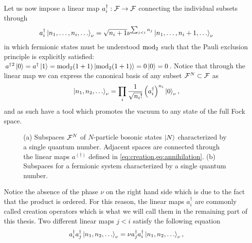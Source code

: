 Let us now impose a linear map $a^\dag_i:\mathcal{F}\rightarrow\mathcal{F}$ connecting the individual subsets through
\begin{align}
    a^\dag_i\ket{n_1,\dots,n_i,\dots}_\nu = \sqrt{n_i+1}\nu^{\sum_{j<i}n_j}\ket{n_1,\dots,n_i+1,\dots}_\nu
    \label{eq:creation}
\end{align}
in which fermionic states must be understood ${\rm mod}_2$ such that the Pauli exclusion principle is explicitly satisfied: $a^\dag{}^2\ket{0}=a^\dag\ket{1}={\rm mod}_2(1+1)\ket{{\rm mod}_2(1+1)} = 0\ket{0} = 0$.
Notice that through the linear map we can express the canonical basis of any subset $\mathcal{F}^N\subset\mathcal{F}$ as
\begin{align}
    \ket{n_1,n_2,\dots}_\nu = \prod_i\frac1{\sqrt{n_i!}}\left(a^\dag_i\right)^{n_i}\ket{0}_\nu,
    \label{eq:Fock_basis}
\end{align}
and as such have a tool which promotes the vacuum to any state of the full Fock space.
\begin{figure}
    \centering
    \hfil
    \caption{(a) Subspaces $\mathcal{F}^N$ of $N$-particle bosonic states $\ket{N}$ characterized by a single quantum number. Adjacent spaces are connected through the linear maps $a^{(\dag)}$ defined in \cref{eq:creation,eq:annihilation}. (b) Subspaces for a fermionic system characterized by a single quantum number.}
    \label{fig:my_label}
\end{figure}
Notice the absence of the phase $\nu$ on the right hand side which is due to the fact that the product is ordered.
For this reason, the linear maps $a^\dag_i$ are commonly called creation operators which is what we will call them in the remaining part of this thesis.
Two different linear maps $j<i$ satisfy the following equation
\begin{align}
    a^\dag_i a^\dag_j\ket{n_1,n_2,\dots}_\nu = \nu a^\dag_ja^\dag_i\ket{n_1,n_2,\dots}_\nu,
\end{align}
